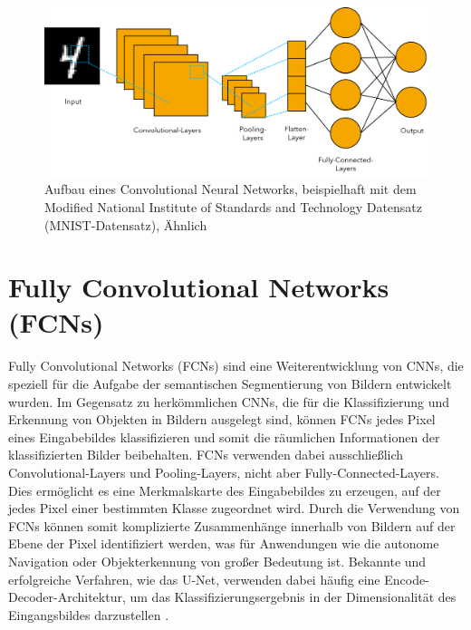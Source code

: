 \begin{figure}[h]
    \centering
    \includegraphics[width=1\textwidth]{bilder/cnn_own.png}
    \captionsetup{font=small} %
    \caption[Aufbau eines Convolutional Neural Networks, beispielhaft mit dem Modified National
    Institute of Standards and Technology Datensatz (MNIST-Datensatz)]{Aufbau eines Convolutional Neural Networks, beispielhaft mit dem Modified National
        Institute of Standards and Technology Datensatz (MNIST-Datensatz), Ähnlich \cite{jalandoni2022use}}
    \label{fig:CNN}
\end{figure}

\section{Fully Convolutional Networks (FCNs)}
Fully Convolutional Networks (FCNs) sind eine Weiterentwicklung von CNNs, die
speziell für die Aufgabe der semantischen Segmentierung von Bildern entwickelt
wurden. Im Gegensatz zu herkömmlichen CNNs, die für die Klassifizierung und
Erkennung von Objekten in Bildern ausgelegt sind, können FCNs jedes Pixel eines
Eingabebildes klassifizieren und somit die räumlichen Informationen der
klassifizierten Bilder beibehalten. FCNs verwenden dabei ausschließlich
Convolutional-Layers und Pooling-Layers, nicht aber Fully-Connected-Layers.
Dies ermöglicht es eine Merkmalskarte des Eingabebildes zu erzeugen, auf der
jedes Pixel einer bestimmten Klasse zugeordnet wird. Durch die Verwendung von
FCNs können somit komplizierte Zusammenhänge innerhalb von Bildern auf der
Ebene der Pixel identifiziert werden, was für Anwendungen wie die autonome
Navigation oder Objekterkennung von großer Bedeutung ist. \cite{7803544}
Bekannte und erfolgreiche Verfahren, wie das U-Net, verwenden dabei häufig eine
Encode-Decoder-Architektur, um das Klassifizierungsergebnis in der
Dimensionalität des Eingangsbildes darzustellen \cite{8309343}.

